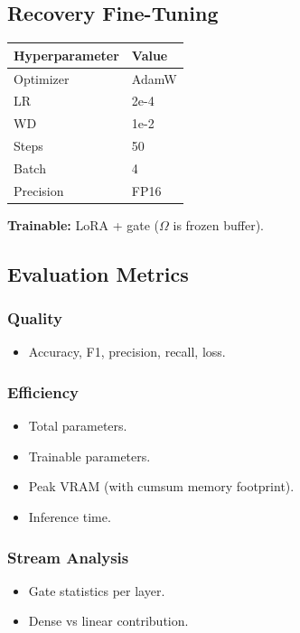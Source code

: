\subsection{Recovery Fine-Tuning}

\begin{table}[H]
\centering
\small
\begin{tabular}{ll}
\toprule
\textbf{Hyperparameter} & \textbf{Value} \\
\midrule
Optimizer & AdamW \\
LR & 2e-4 \\
WD & 1e-2 \\
Steps & 50 \\
Batch & 4 \\
Precision & FP16 \\
\bottomrule
\end{tabular}
\end{table}

\textbf{Trainable:} LoRA + gate ($\Omega$ is frozen buffer).

\subsection{Evaluation Metrics}

\subsubsection{Quality}
\begin{itemize}
\item Accuracy, F1, precision, recall, loss.

\end{itemize}
\subsubsection{Efficiency}
\begin{itemize}
\item Total parameters.
\item Trainable parameters.
\item Peak VRAM (with cumsum memory footprint).
\item Inference time.

\end{itemize}
\subsubsection{Stream Analysis}
\begin{itemize}
\item Gate statistics per layer.
\item Dense vs linear contribution.

\end{itemize}
